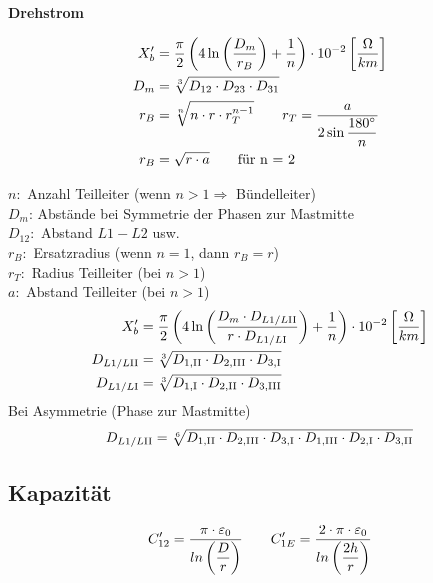 \begin{itemize}
\textbf{Drehstrom}

\begin{align*}
    X_{b}' &= \frac{\pi}{2} \left( 4 \ln \left( \frac{D_{m}}{r_B}\right) +\frac{1}{n} \right) \cdot 10 ^{-2}   \left[\frac{\Omega}{km}\right]\\
    \vspace{5pt}
    D_{m} &= \sqrt[3]{D_{12} \cdot D_{23} \cdot D_{31}}\\
    r_B &= \sqrt[n]{n \cdot r \cdot r_{T}^{n-1}} \qquad r_T = \frac{a}{2 \sin \dfrac{180 \degree}{n}}\\
    r_B &= \sqrt{r \cdot a} \qquad \textnormal{für n = 2}
\end{align*}

$n:$ Anzahl Teilleiter (wenn $n>1 \Rightarrow$ Bündelleiter)\\
$D_m$: Abstände bei Symmetrie der Phasen zur Mastmitte\\
$D_{12}:$ Abstand $L1 - L2$ usw.\\
$r_B:$ Ersatzradius (wenn $n=1$, dann $r_B = r$)\\
$r_T:$ Radius Teilleiter (bei $n>1$)\\
$a:$ Abstand Teilleiter (bei $n>1$)\\



\begin{align*}
    X_{b}' &= \frac{\pi}{2} \left( 4 \ln \left( \frac{D_{m} \cdot D_{L1/L\RN{2}}}{r \cdot D_{L1/L\RN{1}}}\right) + \frac{1}{n} \right) \cdot 10 ^{-2}   \left[\frac{\Omega}{km}\right]\\
    D_{L1/L\RN{2}} &= \sqrt[3]{D_{1,\RN{2}} \cdot D_{2,\RN{3}} \cdot D_{3,\RN{1}}}\\
    D_{L1/L\RN{1}} &= \sqrt[3]{D_{1,\RN{1}} \cdot D_{2,\RN{2}} \cdot D_{3,\RN{3}}}
\end{align*}
Bei Asymmetrie (Phase zur Mastmitte)
\begin{equation*}
    D_{L1/L\RN{2}} = \sqrt[6]{D_{1,\RN{2}} \cdot D_{2,\RN{3}} \cdot D_{3,\RN{1}} \cdot D_{1,\RN{3}} \cdot D_{2,\RN{1}} \cdot D_{3,\RN{2}}}
\end{equation*}

\subsection{Kapazität}
    \begin{equation*}
        C'_{12} = \frac{\pi \cdot \varepsilon_0}{ln\left(\dfrac{D}{r} \right)} \qquad
        C'_{1E} = \frac{2 \cdot \pi \cdot \varepsilon_0}{ln \left( \dfrac{2h}{r} \right)}\\
    \end{equation*}


\end{itemize}
